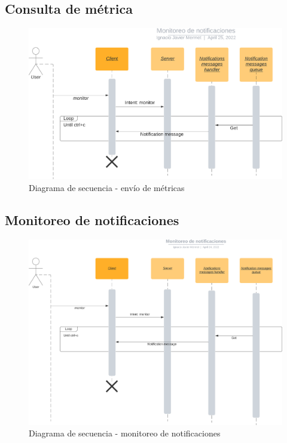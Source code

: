 \documentclass[a4paper,oneside]{article}
\begin{document}
\subsection{Consulta de métrica}
\begin{figure}[H]
\centering
\includegraphics[width=\textwidth]{images/query.png}
\caption{Diagrama de secuencia \-- envío de métricas}
\end{figure}

\subsection{Monitoreo de notificaciones}
\begin{figure}[H]
\centering
\includegraphics[width=\textwidth]{images/notificaciones.png}
\caption{Diagrama de secuencia \-- monitoreo de notificaciones}
\end{figure}
\end{document}
